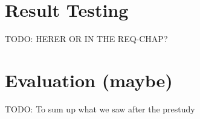\section{Result Testing}
TODO: HERER OR IN THE REQ-CHAP?

\section{Evaluation (maybe)}
TODO:
To sum up what we saw after the prestudy
